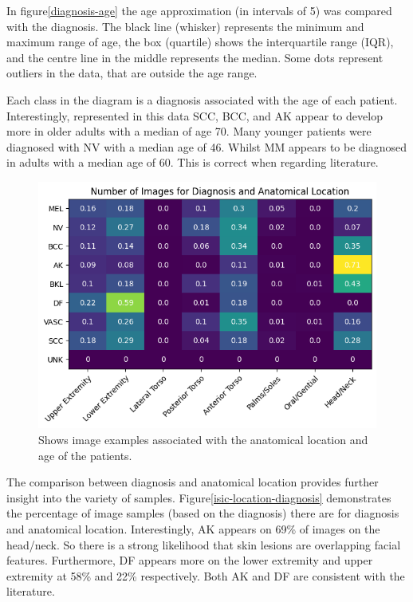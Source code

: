 In figure\ref{diagnosis-age} the age approximation (in intervals of 5) was compared with the diagnosis. The black line (whisker) represents the minimum and maximum range of age, the box (quartile) shows the interquartile range (IQR), and the centre line in the middle represents the median. Some dots represent outliers in the data, that are outside the age range. 

Each class in the diagram is a diagnosis associated with the age of each patient. Interestingly, represented in this data SCC, BCC, and AK appear to develop more in older adults with a median of age 70. Many younger patients were diagnosed with NV with a median age of 46. Whilst MM appears to be diagnosed in adults with a median age of 60. This is correct when regarding literature\cite{}.



\begin{figure}
    \centering
    \includegraphics[scale=0.75]{images/ISIC/isic-location-diagnosis.png}
    \caption{Shows image examples associated with the anatomical location and age of the patients.} 
\end{figure}\label{isic-location-diagnosis}

The comparison between diagnosis and anatomical location provides further insight into the variety of samples. Figure\ref{isic-location-diagnosis} demonstrates the percentage of image samples (based on the diagnosis) there are for diagnosis and anatomical location. Interestingly, AK appears on 69\% of images on the head/neck. So there is a strong likelihood that skin lesions are overlapping facial features. Furthermore, DF appears more on the lower extremity and upper extremity at 58\% and 22\% respectively. Both AK and DF are consistent with the literature\cite{}.

